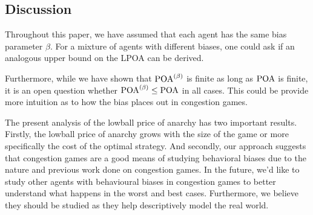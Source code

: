 \documentclass[twoside]{article}
\begin{document}
\begin{multicols}{2}

\section{Discussion}
Throughout this paper, we have assumed that each agent has the same bias
parameter $\beta$. For a mixture of agents with different biases, one could ask
if an analogous upper bound on the LPOA can be derived.

Furthermore, while we have shown that $\text{POA}^{(\beta)}$ is finite as long as $\text{POA}$ is
finite, it is an open question whether $\text{POA}^{(\beta)} \le \text{POA}$ in all cases.  This could be provide more intuition as to how the bias places out in congestion games.

The present analysis of the lowball price of anarchy has two important results.  Firstly, the lowball price of anarchy grows with the size of the game or more specifically the cost of the optimal strategy.  And secondly, our approach suggests that congestion games are a good means of studying behavioral biases due to the nature and previous work done on congestion games.  In the future, we'd like to study other agents with behavioural biases in congestion games to better understand what happens in the worst and best cases.  Furthermore, we believe they should be studied as they help descriptively model the real world.

\printbibliography

\end{multicols}
\end{document}
